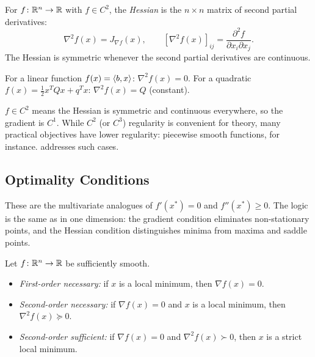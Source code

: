 \begin{definition}[Hessian]\label{def:hessian}
	For $f \colon \mathbb{R}^n \to \mathbb{R}$ with $f \in C^2$, the \emph{Hessian} is the $n \times n$ matrix of second partial derivatives:
	\begin{equation}\label{eq:hessian}
		\nabla^2 f(x) = J_{\nabla f}(x),
		\qquad
		[\nabla^2 f(x)]_{ij} = \frac{\partial^2 f}{\partial x_i \partial x_j}.
	\end{equation}
	The Hessian is symmetric whenever the second partial derivatives are continuous.
\end{definition}

\begin{example}
	For a linear function $f(x) = \langle b, x\rangle$: $\nabla^2 f(x) = 0$.
	For a quadratic $f(x) = \frac{1}{2} x^T Q x + q^T x$: $\nabla^2 f(x) = Q$ (constant).
\end{example}

\begin{remark}\label{rem:regularity}
	$f \in C^2$ means the Hessian is symmetric and continuous everywhere, so the gradient is $C^1$.
	While $C^2$ (or $C^3$) regularity is convenient for theory, many practical objectives have lower regularity: piecewise smooth functions, for instance.
	 addresses such cases.
\end{remark}


\subsection{Optimality Conditions}\label{sec:optimality-conditions}

These are the multivariate analogues of $f'(x^*) = 0$ and $f''(x^*) \geq 0$.
The logic is the same as in one dimension: the gradient condition eliminates non-stationary points, and the Hessian condition distinguishes minima from maxima and saddle points.

\begin{theorem}\label{thm:optimality}
	Let $f \colon \mathbb{R}^n \to \mathbb{R}$ be sufficiently smooth.
	\begin{itemize}
		\item \textit{First-order necessary:} if $x$ is a local minimum, then $\nabla f(x) = 0$.
		\item \textit{Second-order necessary:} if $\nabla f(x) = 0$ and $x$ is a local minimum, then $\nabla^2 f(x) \succeq 0$.
		\item \textit{Second-order sufficient:} if $\nabla f(x) = 0$ and $\nabla^2 f(x) \succ 0$, then $x$ is a strict local minimum.
	\end{itemize}
\end{theorem}

